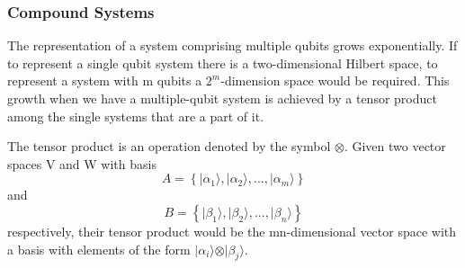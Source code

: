 \subsubsection{Compound Systems}

The representation of a system comprising multiple qubits grows exponentially. If to represent a single qubit system there is a two-dimensional Hilbert space, to represent a system with m qubits a $2^m$-dimension space would be required. This growth when we have a multiple-qubit system is achieved by a tensor product among the single systems that are a part of it.

The tensor product is an operation denoted by the symbol $\otimes$. 
Given two vector spaces V and W with basis 
\begin{equation}
A = \left\{ \vert \alpha_{1} \rangle, \vert \alpha_{2} \rangle , ..., \vert \alpha_{m} \rangle \right\}\end{equation} and 
\begin{equation} B = \left\{ \vert \beta_{1} \rangle, \vert \beta_{2} \rangle , ..., \vert \beta_{n} \rangle \right\}\end{equation} respectively, their tensor product would be the mn-dimensional vector space with a basis with elements of the form $ \vert \alpha_{i} \rangle \otimes \vert \beta_{j} \rangle$\cite{Rieffel2011}.


